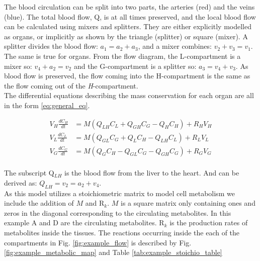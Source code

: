 \documentclass{IEEEtran}
\begin{document}
The blood circulation can be split into two parts, the arteries (red) and the veins (blue). The total blood flow, Q, is at all times preserved, and the local blood flow can be calculated using mixers and splitters. They are either explicitly modelled as organs, or implicitly as shown by the triangle (splitter) or square (mixer). A splitter divides the blood flow: $a_1 = a_2 + a_3$, and a mixer combines: $v_2+v_3 = v_1$. The same is true for organs. From the flow diagram, the L-compartment is a mixer so: $v_4+a_2 = v_2$ and the G-compartment is a splitter so: $a_3 = v_4+v_3$. As blood flow is preserved, the flow coming into the H-compartment is the same as the flow coming out of the \textit{H}-compartment. \\

The differential equations describing the mass conservation for each organ are all in the form \eqref{eq:general_eq}.

\begin{subequations}
\begin{align}
    V_H\frac{dC_H}{dt} & = M (Q_{LH} C_L + Q_{GH} C_G - Q_H C_H) + R_H V_H \\
    V_L\frac{dC_L}{dt} & = M (Q_{GL} C_G + Q_L C_H - Q_{LH} C_L) + R_L V_L\\
    V_G\frac{dC_G}{dt} & = M (Q_G C_H - Q_{GL} C_G - Q_{GH} C_G) + R_G V_G
\end{align}
\end{subequations} \\
The subscript Q$_{LH}$ is the blood flow from the liver to the heart. And can be derived as: $Q_{LH} = v_2 = a_2+v_4$. \\


As this model utilizes a stoichiometric matrix to model cell metabolism \cite{yasemi_jolicoeur_2021} we include the addition of $M$ and R$_k$. $M$ is a square matrix only containing ones and zeros in the diagonal corresponding to the circulating metabolites. In this example A and D are the circulating metabolites. R$_k$ is the production rates of metabolites inside the tissues. 
The reactions occurring inside the each of the compartments in Fig. \ref{fig:example_flow} is described by Fig. \ref{fig:example_metabolic_map} and Table \ref{tab:example_stoichio_table} \\
\end{document}
